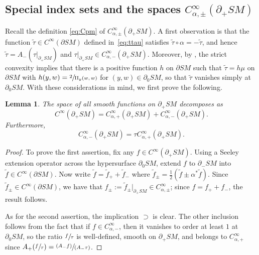 \documentclass[JEP,XML,SOM,Unicode,NoFloatCountersInSection, NoEqCountersInSection,published]{cedram}
\newcommand{\pspfrac}[2]{\sfrac{(#1)}{(#2)}}
\theoremstyle{plain}
\newtheorem{Lemma}[Theorem]{Lemma}
\theoremstyle{definition}
\theoremstyle{remark}
\def\two{\mathrm{II}}
\newcommand{\del}{\partial}
\begin{document}
\subsection{Special index sets and the spaces $C_{\alpha,\pm}^\infty(\partial_+ SM)$} \label{sec:indexSets}

Recall the definition \eqref{eq:Cpm} of $C_{\alpha,\pm}^\infty(\partial_+ SM)$. A first observation is that the function $\tilde \tau \in C^\infty(\partial SM)$ defined in~\eqref{eq:ttau} satisfies $\tilde\tau \circ \alpha = -\tilde\tau$, and hence $\tilde\tau = A_- (\tau|_{\partial_+ SM})$ and $\tau|_{\partial_+ SM}\in C_{\alpha,-}^\infty(\partial_+ SM)$. Moreover, by \cite[Lem.\,6.11]{Monard2020a}, the strict convexity implies that there is a positive function $h$ on $\partial SM$ such that $\tilde \tau = h \mu$ on $\partial SM$ with $h(y,w) = \sfrac{2}{\two_y(w,w)}$ for $(y,w)\in \partial_0 SM$, so that $\tilde\tau$ vanishes simply at $\partial_0 SM$. With these considerations in mind, we first prove the following.

\begin{Lemma} \label{lem:sum}
The space of all smooth functions on $\del_+ SM$ decomposes as
\begin{equation*}
C^\infty (\partial_+ SM) = C_{\alpha,+}^\infty (\partial_+ SM) + C_{\alpha,-}^\infty (\partial_+ SM).
\end{equation*}
Furthermore,
\begin{equation}
C_{\alpha,-}^\infty (\partial_+ SM) = \tau C_{\alpha,+}^\infty (\partial_+ SM).
\label{eq:Cminusprod}
\end{equation}
\end{Lemma}

\begin{proof} To prove the first assertion, fix any $f\in C^\infty (\partial_+ SM)$. Using a Seeley extension operator across the
hypersurface $\partial_0 SM$, extend $f$ to $\partial_- SM$ into $\tilde f\in C^\infty(\partial SM)$. Now write
$\tilde f = \tilde f_+ + \tilde f_-$ where $\tilde f_{\pm} = \frac{1}{2} (\tilde f \pm \alpha^* \tilde f)$. Since
$\tilde f_\pm \in C^\infty(\partial SM)$, we have that $f_\pm := \tilde f_\pm|_{\partial_+ SM} \in C_{\alpha,\pm}^\infty$;
since $f = f_+ + f_-$, the result follows.

As for the second assertion, the implication $\supset$ is clear. The other inclusion follows from the fact that if
$f\in C^\infty_{\alpha,-}$, then it vanishes to order at least $1$ at $\partial_0 SM$, so the ratio $\sfrac{f}{\tau}$
is well-defined, smooth on $\partial_+ SM$, and belongs to $C_{\alpha,+}^\infty$ since $A_+(\sfrac{f}{\tau}) = \pspfrac{A_- f}{A_-\tau}$.
\end{proof}
\end{document}
